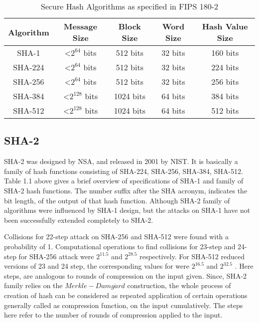   \begin{table}[h]
    \begin{center}
    \begin{tabular}{ *{5}{c} }
      \hline
      Algorithm & Message Size & Block Size & Word Size & Hash Value Size \\ \hline \hline
      SHA-1   & \textless $2^{64}$  bits & 512  bits & 32 bits & 160 bits \\   
      SHA-224 & \textless $2^{64}$  bits & 512  bits & 32 bits & 224 bits \\   
      SHA-256 & \textless $2^{64}$  bits & 512  bits & 32 bits & 256 bits \\   
      SHA-384 & \textless $2^{128}$ bits & 1024 bits & 64 bits & 384 bits \\   
      SHA-512 & \textless $2^{128}$ bits & 1024 bits & 64 bits & 512 bits \\
      \hline
    \end{tabular}
    \caption{ Secure Hash Algorithms as specified in FIPS 180-2} 
  \end{center}
  \end{table}

  \subsection{SHA-2}

  SHA-2 was designed by NSA, and released in 2001 by NIST. It is basically a family of hash functions 
  consisting of SHA-224, SHA-256, SHA-384, SHA-512. Table 1.1 above gives a brief overview of specifications
  of SHA-1 and family of SHA-2 hash functions. The number suffix after the SHA acronym, 
  indicates the bit length, of the output of that hash function. Although SHA-2 family of algorithms
  were influenced by SHA-1 design, but the attacks on SHA-1 have not been successfully extended completely
  to SHA-2.

  Collisions for 22-step attack on SHA-256 and SHA-512 were found with a probability of 1. Computational
  operations to find collisions for 23-step and 24-step for SHA-256 attack were $2^{11.5}$ and $2^{28.5}$ 
  respectively. For SHA-512 reduced versions of 23 and 24 step, the corresponding values for were 
  $2^{16.5}$ and $2^{32.5}$ \cite{00012}. Here steps, are analogous to rounds of compression
  on the input given. Since, SHA-2 family relies on the $Merkle-Damg\dot{a}rd$ construction, the whole
  process of creation of hash can be considered as repeated application of certain operations generally called
  as compression function, on the input cumulatively. The steps here refer to the number of rounds of
  compression applied to the input.

